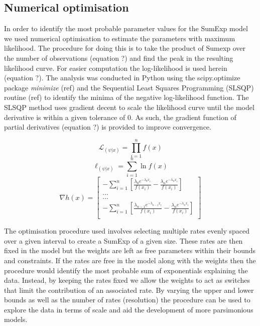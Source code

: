 \documentclass[11pt,usenames,dvipsnames]{article}
\newcommand{\Lagr}{\mathcal{L}}
\begin{document}
\subsection{Numerical optimisation}

In order to identify the most probable parameter values for the SumExp model we used numerical optimisation to estimate the parameters with maximum likelihood. The procedure for doing this is to take the product of Sumexp over the number of observations (equation ?) and find the peak in the resulting likelihood curve. For easier computation the log-likelihood is used herein (equation ?). The analysis was conducted in Python using the scipy.optimize package \textit{minimize} (ref) and the Sequential Least Squares Programming (SLSQP) routine (ref) to identify the minima of the negative log-likelihood function. The SLSQP method uses gradient decent to scale the likelihood curve until the model derivative is within a given tolerance of 0. As such, the gradient function of partial derivatives (equation ?) is provided to improve convergence.

\begin{equation}
\Lagr_{(\psi|x)} = \prod_{i=1}^{n} f(x)
\end{equation} 
\begin{equation}
\ell_{(\psi|x)} = \sum_{i=1}^{n} \ln f(x)
\end{equation} 
\begin{equation}
\nabla h(x) = \begin{bmatrix} -\sum_{i=1}^{n} [\frac{\lambda_0 e^{-\lambda_0 x_i}}{f(x_i)} - \frac{\lambda_n e^{-\lambda_n x_i}}{f(x_i)}] \\
... \\
... \\
-\sum_{i=1}^{n} [\frac{\lambda_{n-1} e^{-\lambda_{n-1} x_i}}{f(x_i)} - \frac{\lambda_n e^{-\lambda_n x_i}}{f(x_i)}] \\
\end{bmatrix}
\end{equation}

The optimisation procedure used involves selecting multiple rates evenly spaced over a given interval to create a SumExp of a given size. These rates are then fixed in the model but the weights are left as free parameters within their bounds and constraints. If the rates are free in the model along with the weights then the procedure would identify the most probable sum of exponentials explaining the data. Instead, by keeping the rates fixed we allow the weights to act as switches that limit the contribution of an associated rate. By varying the upper and lower bounds as well as the number of rates (resolution) the procedure can be used to explore the data in terms of scale and aid the development of more parsimonious models. 
\end{document}
